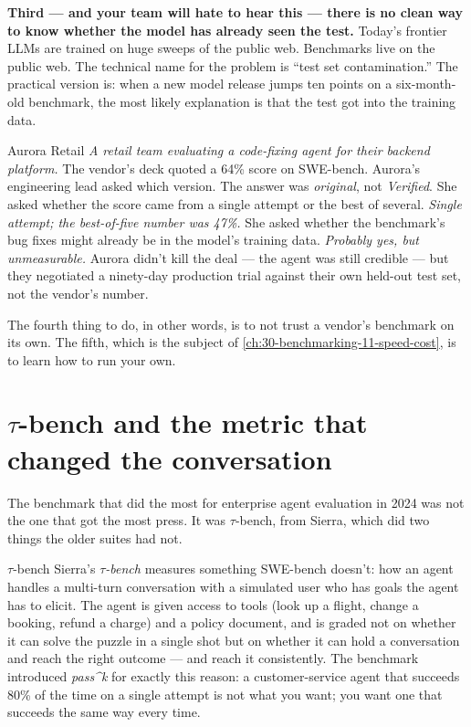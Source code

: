 \textbf{Third --- and your team will hate to hear this --- there is no clean way to know whether the model has already seen the test.} Today's frontier LLMs are trained on huge sweeps of the public web. Benchmarks live on the public web. The technical name for the problem is ``test set contamination.'' The practical version is: when a new model release jumps ten points on a six-month-old benchmark, the most likely explanation is that the test got into the training data.

\begin{TNinpractice}{Aurora Retail} \textit{A retail team evaluating a code-fixing agent for their backend platform.} The vendor's deck quoted a 64\% score on SWE-bench. Aurora's engineering lead asked which version. The answer was \textit{original}, not \textit{Verified}. She asked whether the score came from a single attempt or the best of several. \textit{Single attempt; the best-of-five number was 47\%.} She asked whether the benchmark's bug fixes might already be in the model's training data. \textit{Probably yes, but unmeasurable.} Aurora didn't kill the deal --- the agent was still credible --- but they negotiated a ninety-day production trial against their own held-out test set, not the vendor's number. \end{TNinpractice}

The fourth thing to do, in other words, is to not trust a vendor's benchmark on its own. The fifth, which is the subject of \autoref{ch:30-benchmarking-11-speed-cost}, is to learn how to run your own.

\section{$\tau$-bench and the metric that changed the conversation}

The benchmark that did the most for enterprise agent evaluation in 2024 was not the one that got the most press. It was $\tau$-bench, from Sierra, which did two things the older suites had not.

\begin{TNinpractice}{$\tau$-bench} Sierra's \textit{$\tau$-bench} \citep{yao2024taubench} measures something SWE-bench doesn't: how an agent handles a multi-turn conversation with a simulated user who has goals the agent has to elicit. The agent is given access to tools (look up a flight, change a booking, refund a charge) and a policy document, and is graded not on whether it can solve the puzzle in a single shot but on whether it can hold a conversation and reach the right outcome --- and reach it consistently. The benchmark introduced \textit{pass\textasciicircum k} for exactly this reason: a customer-service agent that succeeds 80\% of the time on a single attempt is not what you want; you want one that succeeds the same way every time. \end{TNinpractice}

